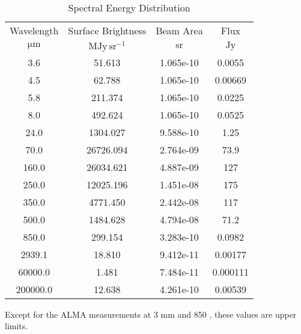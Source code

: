 \begin{table*}[htp]
\centering
\caption{Spectral Energy Distribution}
\begin{tabular}{cccc}
\label{tab:sed}
Wavelength & Surface Brightness & Beam Area & Flux \\
$\mathrm{\mu m}$ & $\mathrm{MJy\,sr^{-1}}$ & $\mathrm{sr}$ & $\mathrm{Jy}$ \\
\hline
3.6 & 51.613 & 1.065e-10 & 0.0055 \\
4.5 & 62.788 & 1.065e-10 & 0.00669 \\
5.8 & 211.374 & 1.065e-10 & 0.0225 \\
8.0 & 492.624 & 1.065e-10 & 0.0525 \\
24.0 & 1304.027 & 9.588e-10 & 1.25 \\
70.0 & 26726.094 & 2.764e-09 & 73.9 \\
160.0 & 26034.621 & 4.887e-09 & 127 \\
250.0 & 12025.196 & 1.451e-08 & 175 \\
350.0 & 4771.450 & 2.442e-08 & 117 \\
500.0 & 1484.628 & 4.794e-08 & 71.2 \\
850.0 & 299.154 & 3.283e-10 & 0.0982 \\
2939.1 & 18.810 & 9.412e-11 & 0.00177 \\
60000.0 & 1.481 & 7.484e-11 & 0.000111 \\
200000.0 & 12.638 & 4.261e-10 & 0.00539 \\
\hline
\end{tabular}
\par
Except for the ALMA measurements at 3 mm and 850 \um, these values are upper limits.
\end{table*}
